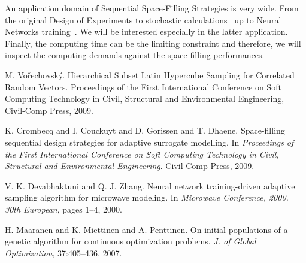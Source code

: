 An application domain of Sequential Space-Filling Strategies is very wide. From the original Design of Experiments to stochastic calculations~\cite{Vor:HSLHS:Madeira:09} up to Neural Networks training~\cite{Devabhaktuni:2000}. We will be interested especially in the latter application. Finally, the computing
time can be the limiting constraint and therefore, we will inspect the computing demands against
the space-filling performances.


\begin{thebibliography}{10}

{\sc M. Vo{\v{r}}echovsk{\'{y}}}. {Hierarchical {S}ubset {L}atin {H}ypercube {S}ampling for Correlated Random Vectors}. Proceedings of the First International Conference on Soft Computing Technology in Civil, Structural and Environmental Engineering, Civil-Comp Press, 2009.



{\sc K. Crombecq and I. Couckuyt and D. Gorissen and T. Dhaene}. {Space-filling sequential design strategies for adaptive surrogate   modelling}. In {\em Proceedings of  the First International Conference on Soft Computing Technology in Civil,   Structural and Environmental Engineering}. Civil-Comp Press, 2009.



{\sc V. K. Devabhaktuni and Q. J. Zhang}. {Neural network training-driven adaptive sampling algorithm for   microwave modeling}. In {\em Microwave Conference, 2000. 30th European}, pages 1--4, 2000.



{\sc H. Maaranen and K. Miettinen and A. Penttinen}. {On initial populations of a genetic algorithm for continuous   optimization problems}. {\em J. of Global Optimization}, 37:405--436, 2007.

\end{thebibliography}

